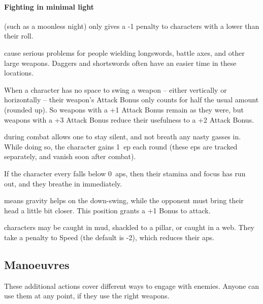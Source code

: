\begin{multicols}{2}
\paragraph{Fighting in minimal light}
(such as a moonless night)
only gives a -1 penalty to characters with a  lower than their roll.

cause serious problems for people wielding longswords, battle axes, and other large weapons.
Daggers and shortswords often have an easier time in these locations.

When a character has no space to swing a weapon -- either vertically or horizontally -- their weapon's Attack Bonus only counts for half the usual amount (rounded up).
So weapons with a +1 Attack Bonus remain as they were, but weapons with a +3 Attack Bonus reduce their usefulness to a +2 Attack Bonus.

during combat allows one to stay silent, and not breath any nasty gasses in.
While doing so, the character gains 1~\gls{ep} each round (these \glspl{ep} are tracked separately, and vanish soon after combat).

If the character every falls below 0~\glspl{ap}, then their stamina and focus has run out, and they breathe in immediately.

means gravity helps on the down-swing, while the opponent must bring their head a little bit closer.
This position grants a +1 Bonus to attack.

\label{trapped}
\label{prone}
characters may be caught in mud, shackled to a pillar, or caught in a web.
They take a penalty to Speed (the default is -2), which reduces their \glspl{ap}.

\subsection{Manoeuvres}

These additional actions cover different ways to engage with enemies.
Anyone can use them at any point, if they use the right weapons.


\end{multicols}
